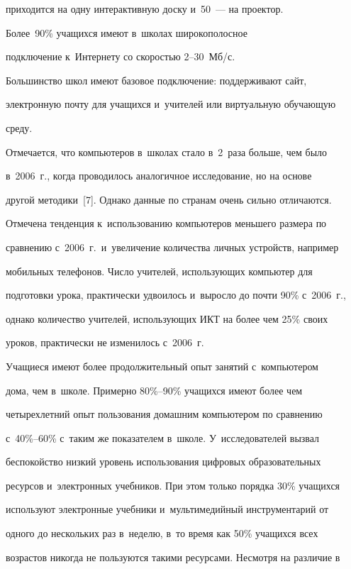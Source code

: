 приходится на одну интерактивную доску и~50~--- на проектор. 


Более~90\% учащихся имеют в~школах широкополосное 


подключение к~Интернету со скоростью 2--30~Мб/с. 


Большинство школ имеют базовое подключение: поддерживают сайт, 


электронную почту для учащихся и~учителей или виртуальную обучающую 


среду.


  


  Отмечается, что компьютеров в~школах стало в~2~раза больше, чем было 


в~2006~г., когда проводилось аналогичное исследование, но на основе 


другой методики~[7]. Однако данные по странам очень сильно отличаются. 


Отмечена тенденция к~использованию компьютеров меньшего размера по 


сравнению с~2006~г.\ и~увеличение количества личных устройств, например 


мобильных телефонов. Число учителей, использующих компьютер для 


подготовки урока, практически удвоилось и~выросло до почти 90\% с~2006~г., 


однако количество учителей, использующих ИКТ на более чем 25\% своих 


уроков, практически не изменилось с~2006~г.


  


  Учащиеся имеют более продолжительный опыт занятий с~компьютером 


дома, чем в~школе. Примерно 80\%--90\% учащихся имеют более чем 


четырехлетний опыт пользования домашним компьютером по сравнению  


с~40\%--60\% с~таким же показателем в~школе. У~исследователей вызвал 


беспокойство низкий уровень использования цифровых образовательных 


ресурсов и~электронных учебников. При этом только порядка 30\% учащихся 


используют электронные учебники и~мультимедийный инструментарий от 


одного до нескольких раз в~неделю, в~то время как 50\% учащихся всех 


возрастов никогда не пользуются такими ресурсами. Несмотря на различие в~


